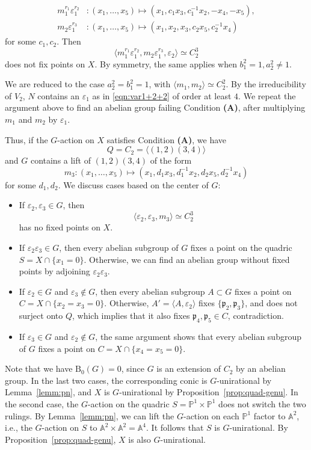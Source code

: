 \documentclass[12pt,reqno]{amsart}
\theoremstyle{plain}
\theoremstyle{remark}
\theoremstyle{definition}
\numberwithin{equation}{section}
\def\bA{{\mathbb A}}
\def\bP{{\mathbb P}}
\begin{document}
\begin{align*}
   m_1^{r_1}\varepsilon_1^{r_2} &:(x_1,\ldots,x_5)\mapsto(x_1,c_1x_3,c_1^{-1}x_2,-x_4,-x_5),\\
        m_2\varepsilon_1^{r_3} &:(x_1,\ldots,x_5)\mapsto(x_1,x_2,x_3,c_2x_5,c_2^{-1}x_4)
\end{align*}
for some $c_1, c_2$. Then 
$$
\langle m_1^{r_1}\varepsilon_1^{r_2},
 m_2\varepsilon_1^{r_3},
\varepsilon_2\rangle\simeq C_2^3
$$
does not fix points on $X$. By symmetry,  the same applies when $b_1^2=1, a_2^2\ne1$.

We are reduced to the case $a_2^2=b_1^2=1$, with  $\langle m_1,m_2\rangle\simeq C_2^2$. By the irreducibility of $V_2$, $N$ contains an $\varepsilon_1$ as in \eqref{eqn:var1+2+2} of order at least $4$. We repeat the argument above to find an abelian group failing Condition {\bf (A)},  after multiplying $m_1$ and $m_2$ by $\varepsilon_1$.

 Thus, if the $G$-action on $X$ satisfies Condition {\bf(A)}, we have
$$
Q=C_2=\langle(1,2)(3,4)\rangle
$$
and $G$ contains a lift of $(1,2)(3,4)$ of the form 
$$
m_3: (x_1,\ldots,x_5)\mapsto(x_1,d_1x_3,d_1^{-1}x_2,d_2x_5,d_2^{-1}x_4)
$$
for some $d_1,d_2$. We discuss cases based on the center of $G$:
\begin{itemize}
\item 
If $\varepsilon_2, \varepsilon_3\in G$, then 
$$
\langle \varepsilon_2, \varepsilon_3,m_3\rangle\simeq C_2^3
$$
has no fixed points on $X$.
    \item 
    If $\varepsilon_2\varepsilon_3\in G$, then every abelian subgroup of $G$ fixes a point on the quadric $S=X\cap\{x_1=0\}$.  Otherwise, we can find an abelian group without fixed points by adjoining $\varepsilon_2\varepsilon_3$.
\item 
If $\varepsilon_2\in G$ and $\varepsilon_3\not \in G$, then every abelian subgroup $A\subset G$ fixes a point on $C=X\cap\{x_2=x_3=0\}$. Otherwise, $A'=\langle A,\varepsilon_2\rangle$ fixes $\{\mathfrak p_2,\mathfrak p_3\}$, and does not surject onto $Q$, which implies that it also fixes $\mathfrak p_4,\mathfrak p_5\in C$, contradiction. 
\item 
If $\varepsilon_3\in G$ and $\varepsilon_2\not \in G$, the same argument shows that every abelian subgroup of $G$ fixes a point on $C=X\cap\{x_4=x_5=0\}$.
\end{itemize}



Note that we have $\mathrm{B_0}(G)=0$, since $G$ is an extension of $C_2$ by an abelian group. In the last two cases, the corresponding conic is $G$-unirational by Lemma~\ref{lemm:pn}, and $X$ is $G$-unirational by Proposition~\ref{prop:quad-genu}.  In the second case, the $G$-action on the quadric $S=\bP^1\times\bP^1$ does not switch the two rulings.  By Lemma~\ref{lemm:pn},  we can lift the $G$-action on each $\bP^1$ factor to $\bA^2$, i.e., the $G$-action on $S$ to $\bA^2\times\bA^2=\bA^4$. It follows that
$S$ is $G$-unirational. By Proposition~\ref{prop:quad-genu}, $X$ is also $G$-unirational. 
\end{document}

